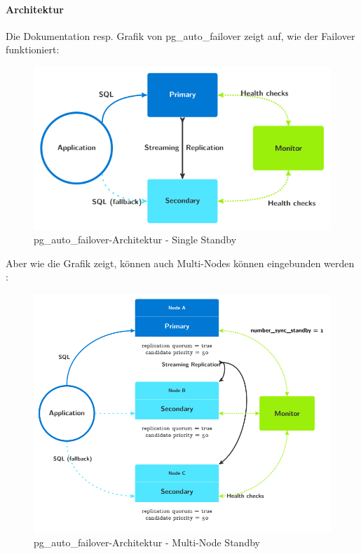 \clearpage
\begin{flushleft}
    \paragraph{Architektur}
    Die Dokumentation resp. Grafik von pg\_auto\_failover  \cite{PZZIZ5RT} zeigt auf, wie der Failover funktioniert:
    \begin{figure}[H]
        \centering
        \includegraphics[width=0.75\linewidth]{source/implementation/evaluation/postgresql_ha_solutions/pg_auto_failover/pg_auto-failover_arch-single-standby}
        \caption{pg\_auto\_failover-Architektur - Single Standby}
        \label{fig:pg_auto-failover_arch-single-standby}
    \end{figure}
    Aber wie die Grafik zeigt, können auch Multi-Nodes können eingebunden werden \cite{4ZKBDG57}:
    \begin{figure}[H]
        \centering
        \includegraphics[width=0.75\linewidth]{source/implementation/evaluation/postgresql_ha_solutions/pg_auto_failover/pg_auto-failover_arch-multi-standby}
        \caption{pg\_auto\_failover-Architektur - Multi-Node Standby}
        \label{fig:pg_auto-failover_arch-multi-standby}
    \end{figure}

\end{flushleft}
